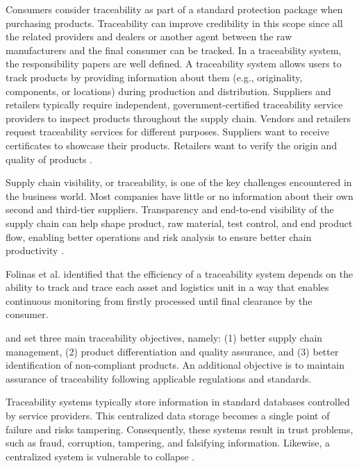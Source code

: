 Consumers consider traceability as part of a standard protection package when purchasing products. Traceability can improve credibility in this scope since all the related providers and dealers or another agent between the raw manufacturers and the final consumer can be tracked. In a traceability system, the responsibility papers are well defined. A traceability system allows users to track products by providing information about them (e.g., originality, components, or locations) during production and distribution. Suppliers and retailers typically require independent, government-certified traceability service providers to inspect products throughout the supply chain. Vendors and retailers request traceability services for different purposes. Suppliers want to receive certificates to showcase their products. Retailers want to verify the origin and quality of products \cite{lu2017adaptable}.

Supply chain visibility, or traceability,  is one of the key challenges encountered in the business world. Most companies have little or no information about their own second and third-tier suppliers. Transparency and end-to-end visibility of the supply chain can help shape product, raw material, test control, and end product flow, enabling better operations and risk analysis to ensure better chain productivity \cite{abeyratne2016blockchain}.

Folinas et al. \cite{folinas2006traceability} identified that the efficiency of a traceability system depends on the ability to track and trace each asset and logistics unit in a way that enables continuous monitoring from firstly processed until final clearance by the consumer.

 and  set three main traceability objectives, namely: (1) better supply chain management, (2) product differentiation and quality assurance, and (3) better identification of non-compliant products. An additional objective is to maintain assurance of traceability following applicable regulations and standards. 

Traceability systems typically store information in standard databases controlled by service providers. This centralized data storage becomes a single point of failure and risks tampering. Consequently, these systems result in trust problems, such as fraud, corruption, tampering, and falsifying information. Likewise, a centralized system is vulnerable to collapse \cite{tian2017supply}.

